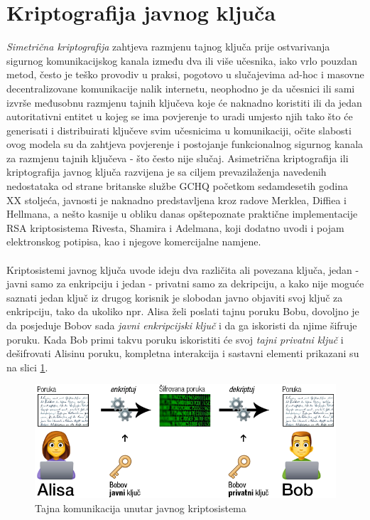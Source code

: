 \section{Kriptografija javnog ključa}
\textit{Simetrična kriptografija} zahtjeva razmjenu tajnog ključa prije ostvarivanja sigurnog komunikacijskog kanala između dva ili više učesnika, iako vrlo pouzdan metod, često je teško provodiv u praksi, pogotovo u slučajevima ad-hoc i masovne decentralizovane komunikacije nalik internetu, neophodno je da učesnici ili sami izvrše međusobnu razmjenu tajnih ključeva koje će naknadno koristiti ili da jedan autoritativni entitet u kojeg se ima povjerenje to uradi umjesto njih tako što će generisati i distribuirati ključeve svim učesnicima u komunikaciji, očite slabosti ovog modela su da zahtjeva povjerenje i postojanje funkcionalnog sigurnog kanala za razmjenu tajnih ključeva - što često nije slučaj. Asimetrična kriptografija ili kriptografija javnog ključa razvijena je sa ciljem prevazilaženja navedenih nedostataka od strane britanske službe GCHQ početkom sedamdesetih godina XX stoljeća, javnosti je naknadno predstavljena kroz radove Merklea\cite{merkle1978secure}, Diffiea i Hellmana\cite{diffie1976new}, a nešto kasnije u obliku danas opštepoznate praktične implementacije RSA kriptosistema Rivesta, Shamira i Adelmana\cite{rivest1978method}, koji dodatno uvodi i pojam elektronskog potipisa, kao i njegove komercijalne namjene.

\paragraph*{}
Kriptosistemi javnog ključa uvode ideju dva različita ali povezana ključa, jedan - javni samo za enkripciju i jedan - privatni samo za dekripciju, a kako nije moguće saznati jedan ključ iz drugog korisnik je slobodan javno objaviti svoj ključ za enkripciju, tako da ukoliko npr. Alisa želi poslati tajnu poruku Bobu, dovoljno je da posjeduje Bobov sada \textit{javni enkripcijski ključ} i da ga iskoristi da njime šifruje poruku. Kada Bob primi takvu poruku iskoristiti će svoj \textit{tajni privatni ključ} i dešifrovati Alisinu poruku, kompletna interakcija i sastavni elementi prikazani su na slici \ref{fig:alice_bob_enc}.

\begin{figure}[H]
    \centering
    \includegraphics[width=1.0\textwidth]{material/bob_alice_enc}
    \caption{Tajna komunikacija unutar javnog kriptosistema}
    \label{fig:alice_bob_enc}
\end{figure}

